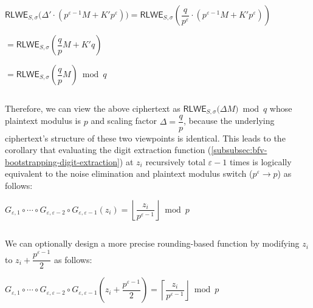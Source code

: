 $\textsf{RLWE}_{S, \sigma}\bm(\Delta' \cdot (p^{\varepsilon-1}M + K'p^\varepsilon) \bm) = \textsf{RLWE}_{S, \sigma}\left(\dfrac{q}{p^\varepsilon} \cdot (p^{\varepsilon-1}M + K'p^\varepsilon) \right)$

$ = \textsf{RLWE}_{S, \sigma}\left(\dfrac{q}{p}M + K'q \right)$

$ = \textsf{RLWE}_{S, \sigma}\left(\dfrac{q}{p}M \right) \bmod q$

$ $

Therefore, we can view the above ciphertext as $ \textsf{RLWE}_{S, \sigma}\bm(\Delta M\bm) \bmod q$ whose plaintext modulus is $p$ and scaling factor $\Delta = \dfrac{q}{p}$, because the underlying ciphertext's structure of these two viewpoints is identical. This leads to the corollary that evaluating the digit extraction function (\autoref{subsubsec:bfv-bootstrapping-digit-extraction}) at $z_i$ recursively total $\varepsilon-1$ times is logically equivalent to the noise elimination and plaintext modulus switch ($p^\varepsilon \rightarrow p$) as follows:

$G_{\varepsilon,1} \circ \cdots \circ G_{\varepsilon,\varepsilon-2} \circ G_{\varepsilon,\varepsilon-1}(z_i) = \left\lfloor \dfrac{z_i}{p^{\varepsilon-1}} \right\rfloor \bmod p$ 


$ $

We can optionally design a more precise rounding-based function by modifying $z_i$ to $z_i + \dfrac{p^{\varepsilon-1}}{2}$ as follows:


$G_{\varepsilon,1} \circ \cdots \circ G_{\varepsilon,\varepsilon-2} \circ G_{\varepsilon,\varepsilon-1}\left(z_i + \dfrac{p^{\varepsilon-1}}{2}\right) = \left\lceil \dfrac{z_i}{p^{\varepsilon-1}} \right\rfloor \bmod p$ 





